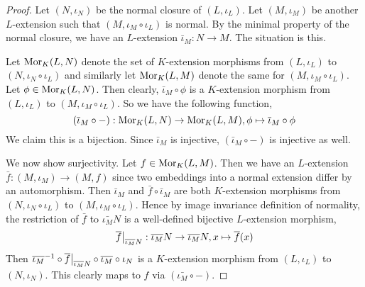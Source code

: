\documentclass[../book.tex]{subfiles}
\begin{document}
\begin{proof}
    Let $(N,\iota_N)$ be the normal closure of $(L,\iota_L)$.
    Let $(M,\iota_M)$ be another $L$-extension such that 
    $(M,\iota_M\circ\iota_L)$ is normal. 
    By the minimal property of the normal closure, 
    we have an $L$-extension $\bar\iota_M : N \to M$. 
    The situation is this. 
    \begin{figure} [H]
        \centering
    \end{figure}
    Let $\text{Mor}_{K}(L, N)$ denote the set of $K$-extension morphisms
    from $(L,\iota_L)$ to $(N,\iota_N\circ\iota_L)$
    and similarly let $\text{Mor}_{K}(L, M)$ denote the same for $(M,\iota_M\circ\iota_L)$. 
    Let $\phi \in \text{Mor}_{K}(L, N)$. Then clearly, 
    $\bar\iota_M \circ \phi$ is a $K$-extension morphism 
    from $(L,\iota_L)$ to $(M,\iota_M\circ\iota_L)$. 
    So we have the following function, \[
        (\overline{\iota}_M \circ - ) : \text{Mor}_{K}(L, N) \to \text{Mor}_{K}(L, M), 
        \phi \mapsto \overline{\iota}_M \circ \phi
    \]
    We claim this is a bijection. 
    Since $\bar\iota_M$ is injective, $(\bar\iota_M \circ -)$ is injective as well.
    
    We now show surjectivity. 
    Let $f \in \text{Mor}_{K}(L, M)$. 
    Then we have an $L$-extension $\bar{f} : (M,\iota_M) \to (M,f)$
    since two embeddings into a normal extension differ by an automorphism. 
    Then $\bar\iota_M$ and $\bar{f}\circ\bar\iota_M$ are
    both $K$-extension morphisms from
    $(N,\iota_N\circ\iota_L)$ to $(M,\iota_M\circ\iota_L)$.
    Hence by image invariance definition of normality, 
    the restriction of $\bar{f}$ to $\bar{\iota_M} N$ is 
    a well-defined bijective $L$-extension morphism, \[
        \res{\bar{f}}{\bar{\iota_M} N} : \bar{\iota_M} N \to \bar{\iota_M} N,
        x \mapsto \bar{f}(x)
    \]
    Then $\bar{\iota_M}^{-1} \circ \res{\bar{f}}{\bar{\iota_M}N} 
    \circ \bar{\iota_M} \circ \iota_N $ is a $K$-extension morphism
    from $(L,\iota_L)$ to $(N,\iota_N)$. 
    This clearly maps to $f$ via $(\bar{\iota_M} \circ -)$. 
\end{proof}
\end{document}
